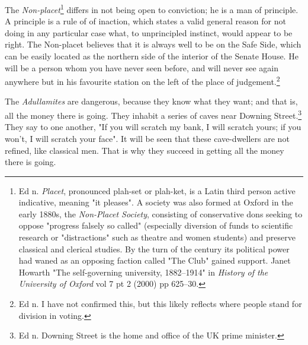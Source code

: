 \documentclass[12pt, oneside, b5paper]{memoir}
\begin{document}
The \textit{Non-placet}\footnote{Ed n. \textit{Placet}, pronounced plah-set or plah-ket, is a Latin third person active indicative, meaning "it pleases". A society was also formed at Oxford in the early 1880s, the \textit{Non-Placet Society}, consisting of conservative dons seeking to oppose "progress falsely so called" (especially diversion of funds to scientific research or "distractions" such as theatre and women students) and preserve classical and clerical studies. By the turn of the century its political power had waned as an opposing faction called "The Club" gained support. Janet Howarth "The self-governing university, 1882--1914" in \textit{History of the University of Oxford} vol 7 pt 2 (2000) pp 625--30.} differs in not being open to conviction; he is a man of principle. A principle is a rule of of inaction, which states a valid general reason for not doing in any particular case what, to unprincipled instinct, would appear to be right. The Non-placet believes that it is always well to be on the Safe Side, which can be easily located as the northern side of the interior of the Senate House. He will be a person whom you have never seen before, and will never see again anywhere but in his favourite station on the left of the place of judgement.\footnote{Ed n. I have not confirmed this, but this likely reflects where people stand for division in voting.}

The \textit{Adullamites} are dangerous, because they know what they want; and that is, all the money there is going. They inhabit a series of caves near Downing Street.\footnote{Ed n. Downing Street is the home and office of the UK prime minister.} They say to one another, "If you will scratch my bank, I will scratch yours; if you won't, I will scratch your face". It will be seen that these cave-dwellers are not refined, like classical men. That is why they succeed in getting all the money there is going.
\end{document}

